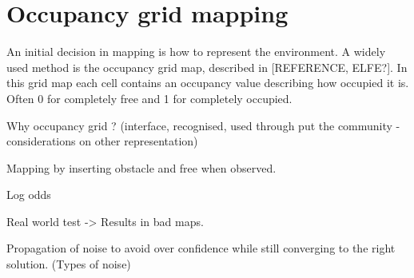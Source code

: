 \section{Occupancy grid mapping}

An initial decision in mapping is how to represent the environment. A widely used method is the occupancy grid map, described in [REFERENCE, ELFE?]. In this grid map each cell contains an occupancy value describing how occupied it is. Often 0 for completely free and 1 for completely occupied. 



Why occupancy grid ? (interface, recognised, used through put the community - considerations on other representation)

Mapping by inserting obstacle and free when observed.

Log odds

Real world test -> Results in bad maps.

Propagation of noise to avoid over confidence while still converging to the right solution. (Types of noise)

